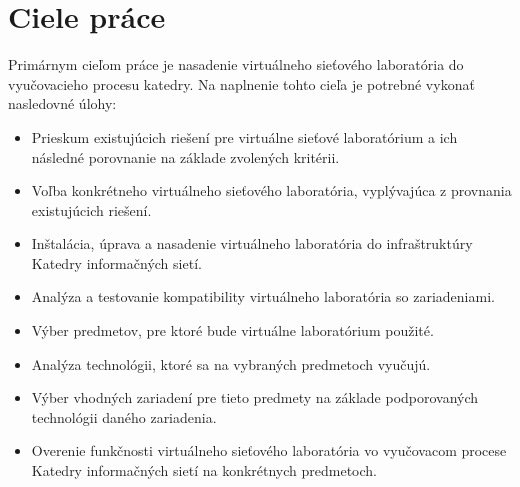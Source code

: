 \chapter{Ciele práce}

Primárnym cieľom práce je nasadenie virtuálneho sieťového laboratória do vyučovacieho procesu katedry. Na naplnenie tohto cieľa je potrebné vykonať nasledovné úlohy:

\begin{itemize}
    \item Prieskum existujúcich riešení pre virtuálne sieťové laboratórium a ich následné porovnanie na základe zvolených kritérii.
    \item Voľba konkrétneho virtuálneho sieťového laboratória, vyplývajúca z provnania existujúcich riešení.
    \item Inštalácia, úprava a nasadenie virtuálneho laboratória do infraštruktúry Katedry informačných sietí.
    \item Analýza a testovanie kompatibility virtuálneho laboratória so zariadeniami.
    \item Výber predmetov, pre ktoré bude virtuálne laboratórium použité.
    \item Analýza technológii, ktoré sa na vybraných predmetoch vyučujú.
    \item Výber vhodných zariadení pre tieto predmety na základe podporovaných technológii daného zariadenia.
    \item Overenie funkčnosti virtuálneho sieťového laboratória vo vyučovacom procese Katedry informačných sietí na konkrétnych predmetoch.
\end{itemize}